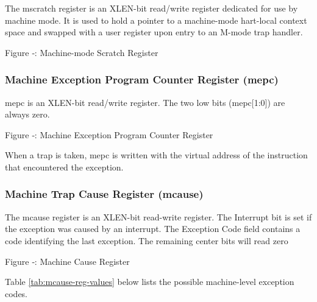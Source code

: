 The mscratch register is an XLEN-bit read/write register dedicated for
use by machine mode. It is used to hold a pointer to a machine-mode
hart-local context space and swapped with a user register upon entry to
an M-mode trap handler.

\missingfigure{}

Figure ‑: Machine-mode Scratch Register

\subsubsection{Machine Exception Program Counter Register
(mepc)}\label{machine-exception-program-counter-register-mepc}

mepc is an XLEN-bit read/write register. The two low bits
(mepc{[}1:0{]}) are always zero.

\missingfigure{}

Figure ‑: Machine Exception Program Counter Register

When a trap is taken, mepc is written with the virtual address of the
instruction that encountered the exception.

\subsubsection{Machine Trap Cause Register
(mcause)}\label{machine-trap-cause-register-mcause}

The mcause register is an XLEN-bit read-write register. The Interrupt
bit is set if the exception was caused by an interrupt. The Exception
Code field contains a code identifying the last exception. The remaining
center bits will read zero

\missingfigure{}

Figure ‑: Machine Cause Register

Table \ref{tab:mcause-reg-values} below lists the possible machine-level exception codes.


